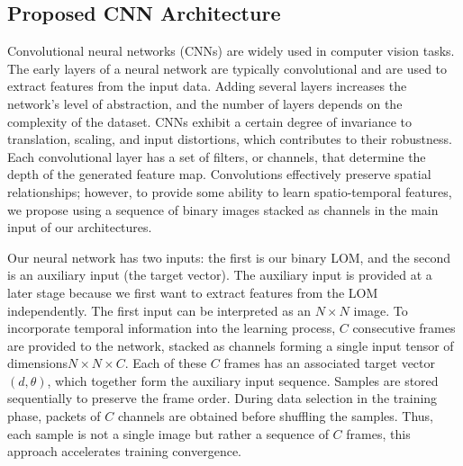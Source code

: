 \documentclass[robotics,article,submit,pdftex,moreauthors]{Definitions/mdpi}
\begin{document}
\subsection{Proposed CNN Architecture} \label{subsec:cnn_arq}

Convolutional neural networks (CNNs) \citep{krizhevsky2012imagenet} are widely used in computer vision tasks. The early layers of a neural network are typically convolutional and are used to extract features from the input data. Adding several layers increases the network’s level of abstraction, and the number of layers depends on the complexity of the dataset. CNNs exhibit a certain degree of invariance to translation, scaling, and input distortions, which contributes to their robustness. Each convolutional layer has a set of filters, or channels, that determine the depth of the generated feature map. Convolutions effectively preserve spatial relationships; however, to provide some ability to learn spatio-temporal features, we propose using a sequence of binary images stacked as channels in the main input of our architectures.

Our neural network has two inputs: the first is our binary LOM, and the second is an auxiliary input (the target vector). The auxiliary input is provided at a later stage because we first want to extract features from the LOM independently. The first input can be interpreted as an $N\times N$ image. To incorporate temporal information into the learning process, $C$ consecutive frames are provided to the network, stacked as channels forming a single input tensor of dimensions$N\times N \times C$. Each of these $C$ frames has an associated target vector$(d, \theta)$, which together form the auxiliary input sequence. Samples are stored sequentially to preserve the frame order. During data selection in the training phase, packets of $C$ channels are obtained before shuffling the samples. Thus, each sample is not a single image but rather a sequence of $C$ frames, this approach accelerates training convergence.
\end{document}

